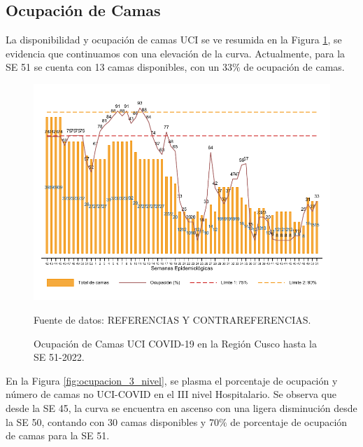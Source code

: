 \documentclass[12pt,a4paper,openany]{book}
\begin{document}
		
	\clearpage
	\subsection*{Ocupación de Camas}
	\noindent La disponibilidad y ocupación de camas UCI se ve resumida en la Figura \ref{fig:ocupacion_uci}, se evidencia que continuamos con una elevación de la curva. Actualmente, para la SE 51 se cuenta con 13 camas disponibles, con un 33$\%$ de ocupación de camas.
	
	\begin{figure}[h]
		\caption{Ocupación de Camas UCI COVID-19 en la Región Cusco hasta la SE 51-2022.}\label{fig:ocupacion_uci}
		\begin{center}
			\includegraphics[width=0.95\linewidth]{../figuras/uci.pdf}
		\end{center}
		{\footnotesize {Fuente de datos: REFERENCIAS Y CONTRAREFERENCIAS.}}
	\end{figure}
	\cleardoublepage
	
	En la Figura \ref{fig:ocupacion_3_nivel}, se plasma el porcentaje de ocupación y número de camas no UCI-COVID en el III nivel Hospitalario. Se observa que desde la SE 45, la curva se encuentra en ascenso con una ligera disminución desde la SE 50, contando con 30 camas disponibles y 70$\%$ de porcentaje de ocupación de camas para la SE 51.
	
\end{document}
